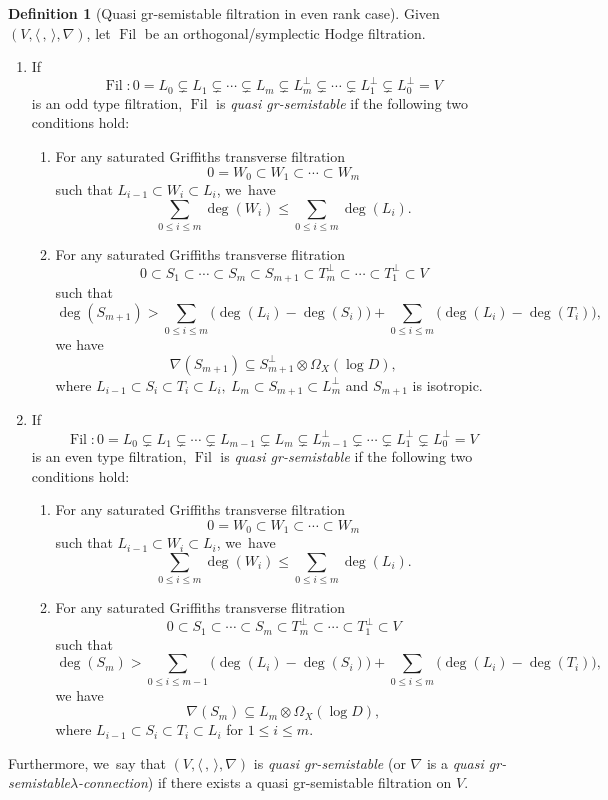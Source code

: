 \documentclass[JEP,XML,SOM,Unicode,published]{cedram}
\newcommand{\lconnection}{$\lambda$\nobreakdash-con\-nec\-tion\xspace}
\newcommand{\grsemistable}{gr\nobreakdash-semi\-stable\xspace}
\DeclareMathOperator{\Filt}{Fil}
\theoremstyle{plain}
\theoremstyle{definition}
\newtheorem{defn}[thm]{Definition}
\begin{document}
\skpt
\begin{defn}[Quasi \grsemistable filtration in even rank case]\label{defn_gr_semi_even}
Given $(V,\langle \,, \, \rangle,\nabla)$, let $\Filt$ be an orthogonal/symplectic Hodge filtration. 
\begin{enumerate}
\item If
\[
\Filt: 0= L_0 \subsetneq L_1 \subsetneq \cdots \subsetneq L_m \subsetneq L_m^\perp\subsetneq\cdots \subsetneq L_1^\perp\subsetneq L_0^\perp= V
\]
is an odd type filtration, $\Filt$ is \emph{quasi \grsemistable} if the following two conditions hold: 
\begin{enumerate}\renewcommand{\theenumii}{\Roman{enumii}}
\item\label{cond2:I}
For any saturated Griffiths transverse filtration
\[
0=W_0\subset W_1 \subset \cdots\subset W_m
\]
such that $L_{i-1}\subset W_i\subset L_i$, we~have
\[
\sum_{0\leq i\leq m}\deg(W_i)\leqslant\sum_{0\leq i\leq m}\deg(L_i).
\]

\item\label{cond2:II}
For any saturated Griffiths transverse flitration
\[
0\subset S_1 \subset \cdots\subset S_m\subset S_{m+1}\subset T_m^\perp\subset\cdots \subset T_1^\perp\subset V
\]
such that
\[
\deg(S_{m+1})>\sum_{0\leq i\leq m}\big(\deg(L_i)-\deg(S_i)\big)+\sum_{0\leq i\leq m}\big(\deg(L_i)-\deg(T_i)\big),
\]
we have
\[
\nabla(S_{m+1})\subseteq S_{m+1}^\perp \otimes\Omega_X(\log D),
\]
where $L_{i-1}\subset S_i \subset T_i \subset L_i,\ L_m\subset S_{m+1}\subset L_m^\perp$ and $S_{m+1}$
is isotropic.
\end{enumerate}

\item If
\[
\Filt: 0= L_0 \subsetneq L_1 \subsetneq \cdots\subsetneq L_{m-1} \subsetneq L_m \subsetneq L_{m-1}^\perp\subsetneq\cdots \subsetneq L_1^\perp\subsetneq L_0^\perp= V
\]
is an even type filtration, $\Filt$ is \emph{quasi \grsemistable} if the following two conditions hold:
\begin{enumerate}\renewcommand{\theenumi}{\Roman{enumi}}
\item\label{enum:I}
For any saturated Griffiths transverse filtration
\[
0=W_0\subset W_1 \subset \cdots\subset W_m
\]
such that $L_{i-1}\subset W_i\subset L_i$, we~have
\[
\sum_{0\leq i\leq m}\deg(W_i)\leqslant\sum_{0\leq i\leq m}\deg(L_i).
\]

\item\label{enum:II}
For any saturated Griffiths transverse flitration
\[
0\subset S_1 \subset \cdots\subset S_m\subset T_m^\perp\subset\cdots \subset T_1^\perp\subset V
\]
such that
\[
\deg(S_m)>\sum_{0\leq i\leq m-1}\big(\deg(L_i)-\deg(S_i)\big)+\sum_{0\leq i\leq m}\big(\deg(L_i)-\deg(T_i)\big),
\]
we have
\[
\nabla(S_m)\subseteq L_m \otimes\Omega_X(\log D),
\]
where $L_{i-1}\subset S_i \subset T_i \subset L_i$ for $1\leq i\leq m$.
\end{enumerate}
\end{enumerate}
Furthermore, we~say that $(V,\langle \,, \, \rangle,\nabla)$ is \emph{quasi \grsemistable} (or $\nabla$ is a \emph{quasi \grsemistable \lconnection}) if there exists a quasi \grsemistable filtration on $V$.
\end{defn}
\end{document}
